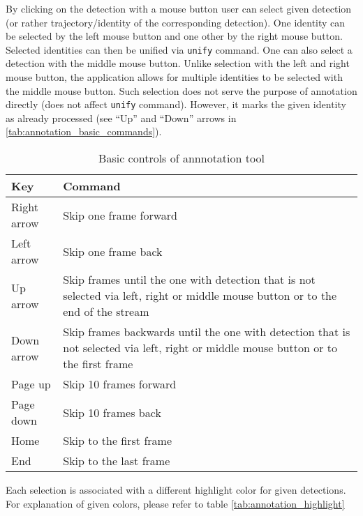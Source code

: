 By clicking on the detection with a mouse button user can select given detection (or rather trajectory/identity of the corresponding detection). One identity can be selected
by the left mouse button and one other by the right mouse button. Selected identities can then be unified via \verb+unify+ command. One can also select a detection with the
middle mouse button. Unlike selection with the left and right mouse button, the application
allows for multiple identities to be selected with the middle mouse button. Such selection
does not serve the purpose of annotation directly (does not affect \verb+unify+ command).
However, it marks the given identity as already processed (see ``Up'' and ``Down'' arrows in \autoref{tab:annotation_basic_commands}).

\begin{table}
    \centering
    \begin{tabularx}{\textwidth}{l|X}
         \textbf{Key} & \textbf{Command} \\ \hline
         Right arrow & Skip one frame forward \\ \hline
         Left arrow & Skip one frame back \\ \hline
         Up arrow & Skip frames until the one with detection that is not selected
         via left, right or middle mouse button or to the end of the stream \\ \hline
         Down arrow & Skip frames backwards until the one with detection that is not selected via left, right or middle mouse button or to the first frame \\ \hline
         Page up & Skip 10 frames forward \\ \hline
         Page down & Skip 10 frames back \\ \hline
         Home & Skip to the first frame \\ \hline
         End & Skip to the last frame
    \end{tabularx}
    \caption{Basic controls of annnotation tool}
    \label{tab:annotation_basic_commands}
\end{table}

Each selection is associated with a different highlight color for given detections.
For explanation of given colors, please refer to table \ref{tab:annotation_highlight}

